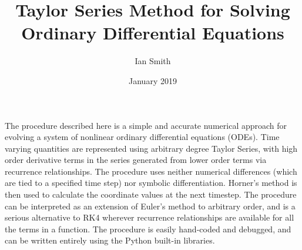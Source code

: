 \documentclass[11pt]{article}
\title{\textbf{Taylor Series Method for Solving Ordinary Differential Equations}}
\author{Ian Smith}
\date{January 2019}
\begin{document}
\maketitle

\abstract
The procedure described here is a simple and accurate numerical approach for evolving a system of nonlinear ordinary differential equations (ODEs).
Time varying quantities are represented using arbitrary degree Taylor Series, with high order derivative terms in the series generated from lower order terms via recurrence relationships.
The procedure uses neither numerical differences (which are tied to a specified time step) nor symbolic differentiation.
Horner's method is then used to calculate the coordinate values at the next timestep.
The procedure can be interpreted as an extension of Euler's method to arbitrary order, and is a serious alternative to RK4 wherever recurrence relationships are available for all the terms in a function.
The procedure is easily hand-coded and debugged, and can be written entirely using the Python built-in libraries.
\end{document}
